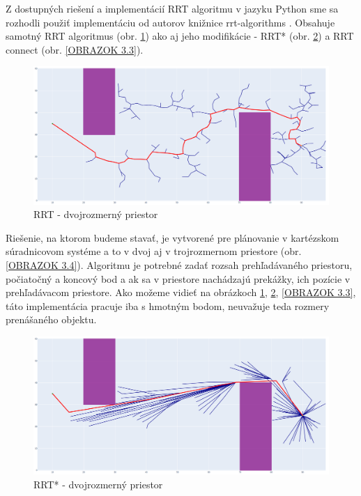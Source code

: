 Z dostupných riešení a implementácií RRT algoritmu v jazyku Python sme sa rozhodli použiť implementáciu od autorov knižnice rrt-algorithms \cite{RRT-python}. Obsahuje samotný RRT algoritmus (obr. \ref{OBRAZOK 3.1}) ako aj jeho modifikácie - RRT* (obr. \ref{OBRAZOK 3.2}) a RRT connect (obr. \ref{OBRAZOK 3.3}).

\begin{figure}[]
	\centering
	\includegraphics[width=140mm]{img/RRT-2D.png}
	\caption{RRT - dvojrozmerný priestor} \label{OBRAZOK 3.1} 
\end{figure} 
Riešenie, na ktorom budeme stavať, je vytvorené pre plánovanie v kartézskom súradnicovom systéme a to v dvoj aj v trojrozmernom priestore (obr. \ref{OBRAZOK 3.4}). Algoritmu je potrebné zadať rozsah prehľadávaného priestoru, počiatočný a koncový bod a ak sa v priestore nachádzajú prekážky, ich pozície v prehľadávacom priestore. Ako možeme vidieť na obrázkoch \ref{OBRAZOK 3.1}, \ref{OBRAZOK 3.2}, \ref{OBRAZOK 3.3}, táto implementácia pracuje iba s hmotným bodom, neuvažuje teda rozmery prenášaného objektu.
\begin{figure}[]
	\centering
	\includegraphics[width=140mm]{img/RRTstar-2D.png}
	\caption{RRT* - dvojrozmerný priestor} \label{OBRAZOK 3.2} 
\end{figure} 

